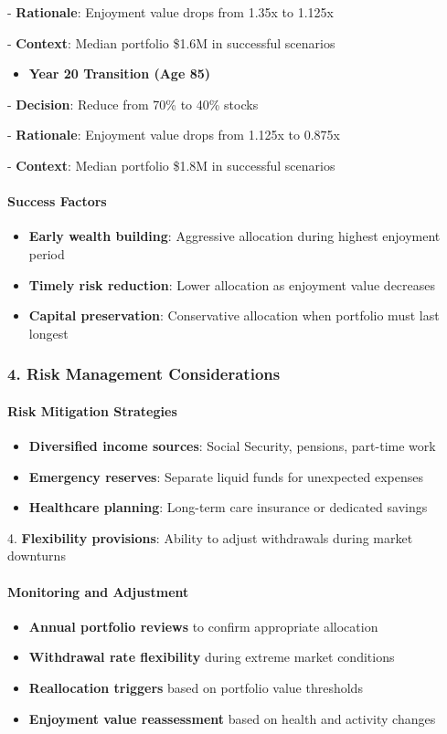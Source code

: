 \documentclass[11pt,letterpaper]{article}
\begin{document}
   - \textbf{Rationale}: Enjoyment value drops from 1.35x to 1.125x

   - \textbf{Context}: Median portfolio \$1.6M in successful scenarios


\begin{itemize}
\item \textbf{Year 20 Transition (Age 85)}
\end{itemize}
   - \textbf{Decision}: Reduce from 70\% to 40\% stocks

   - \textbf{Rationale}: Enjoyment value drops from 1.125x to 0.875x

   - \textbf{Context}: Median portfolio \$1.8M in successful scenarios


\paragraph{Success Factors}
\begin{itemize}
\item \textbf{Early wealth building}: Aggressive allocation during highest enjoyment period
\item \textbf{Timely risk reduction}: Lower allocation as enjoyment value decreases
\item \textbf{Capital preservation}: Conservative allocation when portfolio must last longest
\end{itemize}

\subsubsection{4. Risk Management Considerations}

\paragraph{Risk Mitigation Strategies}
\begin{itemize}
\item \textbf{Diversified income sources}: Social Security, pensions, part-time work
\item \textbf{Emergency reserves}: Separate liquid funds for unexpected expenses
\item \textbf{Healthcare planning}: Long-term care insurance or dedicated savings
\end{itemize}
4. \textbf{Flexibility provisions}: Ability to adjust withdrawals during market downturns


\paragraph{Monitoring and Adjustment}
\begin{itemize}
\item \textbf{Annual portfolio reviews} to confirm appropriate allocation
\item \textbf{Withdrawal rate flexibility} during extreme market conditions
\item \textbf{Reallocation triggers} based on portfolio value thresholds
\item \textbf{Enjoyment value reassessment} based on health and activity changes
\end{itemize}
\end{document}
